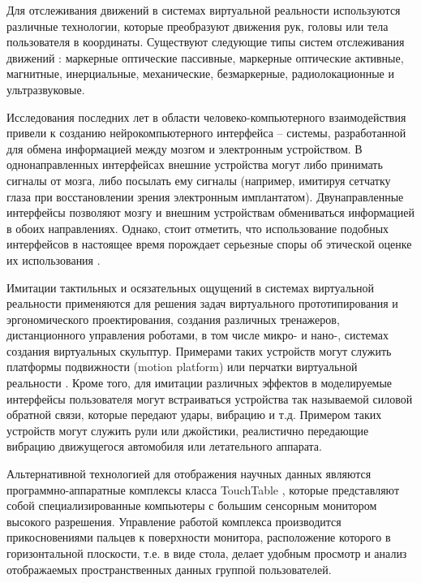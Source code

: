 Для отслеживания движений в системах виртуальной реальности используются различные технологии, которые преобразуют движения рук, головы или тела пользователя в координаты. Существуют следующие типы систем отслеживания движений \citep{dk55}: маркерные оптические пассивные, маркерные оптические активные, магнитные, инерциальные, механические, безмаркерные, радиолокационные и ультразвуковые.

Исследования последних лет в области человеко-компьютерного взаимодействия привели к созданию нейрокомпьютерного интерфейса \citep{dk56}\citep{dk57}\citep{dk58} – системы, разработанной для обмена информацией между мозгом и электронным устройством. В однонаправленных интерфейсах внешние устройства могут либо принимать сигналы от мозга, либо посылать ему сигналы (например, имитируя сетчатку глаза при восстановлении зрения электронным имплантатом). Двунаправленные интерфейсы позволяют мозгу и внешним устройствам обмениваться информацией в обоих направлениях. Однако, стоит отметить, что использование подобных интерфейсов в настоящее время порождает серьезные споры об этической оценке их использования \citep{dk59}\citep{dk60}.

Имитации тактильных и осязательных ощущений в системах виртуальной реальности применяются для решения задач виртуального прототипирования и эргономического проектирования, создания различных тренажеров, дистанционного управления роботами, в том числе микро- и нано-, системах создания виртуальных скульптур. Примерами таких устройств могут служить платформы подвижности (motion platform) \citep{dk61} или перчатки виртуальной реальности \citep{dk62}. Кроме того, для имитации различных эффектов в моделируемые интерфейсы пользователя могут встраиваться устройства так называемой силовой обратной связи, которые передают удары, вибрацию и т.д. Примером таких устройств могут служить рули или джойстики, реалистично передающие вибрацию движущегося автомобиля или летательного аппарата.

Альтернативной технологией для отображения научных данных являются программно-аппаратные комплексы класса TouchTable \citep{dk63}\citep{dk64}, которые представляют собой специализированные компьютеры с большим сенсорным монитором высокого разрешения. Управление работой комплекса производится прикосновениями пальцев к поверхности монитора, расположение которого в горизонтальной плоскости, т.е. в виде стола, делает удобным просмотр и анализ отображаемых пространственных данных группой пользователей.

